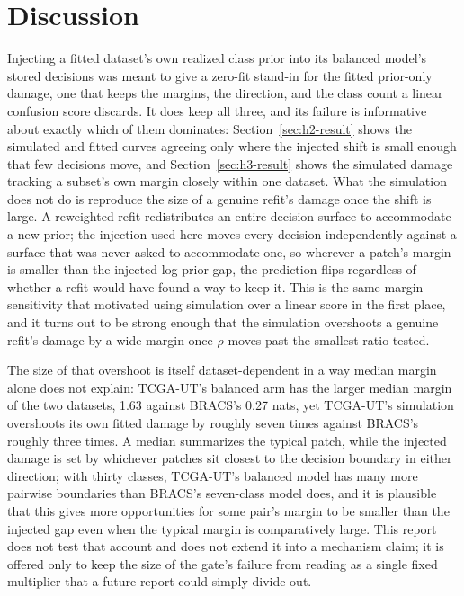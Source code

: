 \section{Discussion}
\label{sec:discussion}
Injecting a fitted dataset's own realized class prior into its balanced model's stored decisions was meant to give a zero-fit stand-in for the fitted prior-only damage, one that keeps the margins, the direction, and the class count a linear confusion score discards. It does keep all three, and its failure is informative about exactly which of them dominates: Section~\ref{sec:h2-result} shows the simulated and fitted curves agreeing only where the injected shift is small enough that few decisions move, and Section~\ref{sec:h3-result} shows the simulated damage tracking a subset's own margin closely within one dataset. What the simulation does not do is reproduce the size of a genuine refit's damage once the shift is large. A reweighted refit redistributes an entire decision surface to accommodate a new prior; the injection used here moves every decision independently against a surface that was never asked to accommodate one, so wherever a patch's margin is smaller than the injected log-prior gap, the prediction flips regardless of whether a refit would have found a way to keep it. This is the same margin-sensitivity that motivated using simulation over a linear score in the first place, and it turns out to be strong enough that the simulation overshoots a genuine refit's damage by a wide margin once $\rho$ moves past the smallest ratio tested.

The size of that overshoot is itself dataset-dependent in a way median margin alone does not explain: TCGA-UT's balanced arm has the larger median margin of the two datasets, 1.63 against BRACS's 0.27 nats, yet TCGA-UT's simulation overshoots its own fitted damage by roughly seven times against BRACS's roughly three times. A median summarizes the typical patch, while the injected damage is set by whichever patches sit closest to the decision boundary in either direction; with thirty classes, TCGA-UT's balanced model has many more pairwise boundaries than BRACS's seven-class model does, and it is plausible that this gives more opportunities for some pair's margin to be smaller than the injected gap even when the typical margin is comparatively large. This report does not test that account and does not extend it into a mechanism claim; it is offered only to keep the size of the gate's failure from reading as a single fixed multiplier that a future report could simply divide out.

